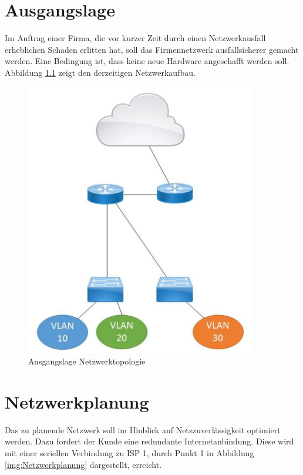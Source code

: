 \thispagestyle{standard}
\pagestyle{standard}
\chapter{Ausgangslage}

Im Auftrag einer Firma, die vor kurzer Zeit durch einen Netzwerkausfall erheblichen Schaden erlitten hat, soll das Firmennetzwerk ausfallsicherer gemacht werden. Eine Bedingung ist, dass keine neue Hardware angeschafft werden soll. Abbildung \ref{img:Ausgangslage} zeigt den derzeitigen Netzwerkaufbau.

\begin{figure}[H]
	\centering
	\includegraphics[width=0.9\textwidth]{img/Ausgangslage.JPG}
	\caption{Ausgangslage Netzwerktopologie}
	\label{img:Ausgangslage}
\end{figure}

\chapter{Netzwerkplanung}

Das zu planende Netzwerk soll im Hinblick auf Netzzuverlässigkeit optimiert werden. Dazu fordert der Kunde eine redundante Internetanbindung. Diese wird mit einer seriellen Verbindung zu \ac{ISP} 1, durch Punkt 1 in Abbildung \ref{img:Netzwerkplanung} dargestellt, erreicht. 

